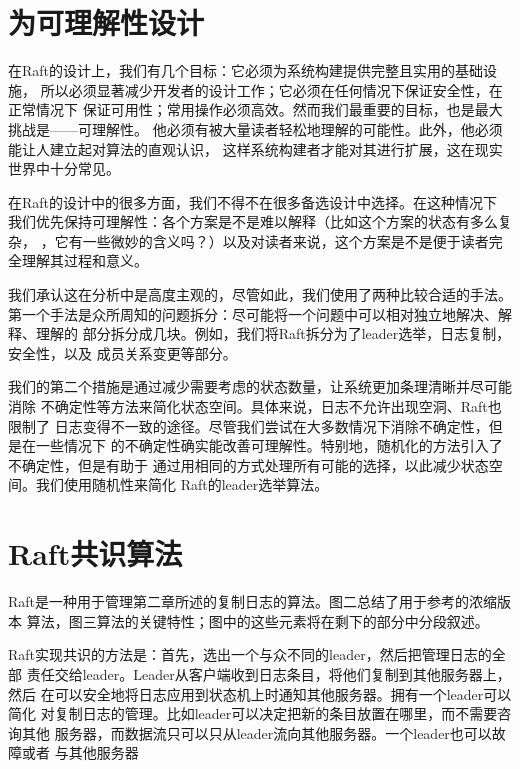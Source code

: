 \chapter{为可理解性设计}
在Raft的设计上，我们有几个目标：它必须为系统构建提供完整且实用的基础设施，
所以必须显著减少开发者的设计工作；它必须在任何情况下保证安全性，在正常情况下
保证可用性；常用操作必须高效。然而我们最重要的目标，也是最大挑战是——可理解性。
他必须有被大量读者轻松地理解的可能性。此外，他必须能让人建立起对算法的直观认识，
这样系统构建者才能对其进行扩展，这在现实世界中十分常见。

在Raft的设计中的很多方面，我们不得不在很多备选设计中选择。在这种情况下
我们优先保持可理解性：各个方案是不是难以解释（比如这个方案的状态有多么复杂，
，它有一些微妙的含义吗？）以及对读者来说，这个方案是不是便于读者完全理解其过程和意义。

我们承认这在分析中是高度主观的，尽管如此，我们使用了两种比较合适的手法。
第一个手法是众所周知的问题拆分：尽可能将一个问题中可以相对独立地解决、解释、理解的
部分拆分成几块。例如，我们将Raft拆分为了leader选举，日志复制，安全性，以及
成员关系变更等部分。

我们的第二个措施是通过减少需要考虑的状态数量，让系统更加条理清晰并尽可能消除
不确定性等方法来简化状态空间。具体来说，日志不允许出现空洞、Raft也限制了
日志变得不一致的途径。尽管我们尝试在大多数情况下消除不确定性，但是在一些情况下
的不确定性确实能改善可理解性。特别地，随机化的方法引入了不确定性，但是有助于
通过用相同的方式处理所有可能的选择，以此减少状态空间。我们使用随机性来简化
Raft的leader选举算法。

\chapter{Raft共识算法}

Raft是一种用于管理第二章所述的复制日志的算法。图二总结了用于参考的浓缩版本
算法，图三算法的关键特性；图中的这些元素将在剩下的部分中分段叙述。

Raft实现共识的方法是：首先，选出一个与众不同的leader，然后把管理日志的全部
责任交给leader。Leader从客户端收到日志条目，将他们复制到其他服务器上，然后
在可以安全地将日志应用到状态机上时通知其他服务器。拥有一个leader可以简化
对复制日志的管理。比如leader可以决定把新的条目放置在哪里，而不需要咨询其他
服务器，而数据流只可以只从leader流向其他服务器。一个leader也可以故障或者
与其他服务器